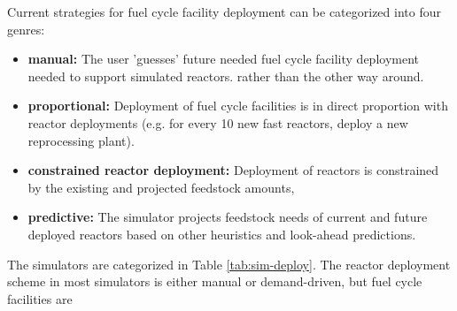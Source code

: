 Current strategies for fuel cycle facility deployment can be categorized into 
four genres: 


\begin{itemize}
        \item \textbf{manual:} The user 'guesses' future needed fuel cycle facility 
                deployment needed to support simulated reactors.
                rather than the other way around. 
        \item \textbf{proportional:} Deployment of fuel cycle facilities is in 
                direct proportion with reactor deployments (e.g. for every 10 
                new fast reactors, deploy a new reprocessing plant).
        \item \textbf{constrained reactor deployment:} Deployment of reactors is 
                constrained by the existing and projected feedstock amounts, 
        \item \textbf{predictive:} The simulator projects feedstock needs of 
                current and future deployed reactors based on other heuristics 
                and look-ahead predictions. 
\end{itemize}

The simulators are categorized in Table \ref{tab:sim-deploy}. The reactor deployment scheme in most simulators is either manual or demand-driven, but fuel cycle facilities are 

